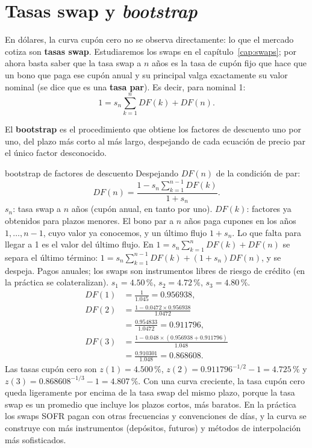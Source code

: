 \section{Tasas swap y \emph{bootstrap}}

En dólares, la curva cupón cero no se observa directamente: lo que el mercado cotiza son \textbf{tasas swap}. Estudiaremos los swaps en el capítulo~\ref{cap:swaps}; por ahora basta saber que la tasa swap a $n$ años es la tasa de cupón fijo que hace que un bono que paga ese cupón anual y su principal valga exactamente su valor nominal (se dice que es una \textbf{tasa par}). Es decir, para nominal 1:
\[ 1=s_n\sum_{k=1}^{n}DF(k)+DF(n). \]

\begin{definicion}
El \textbf{bootstrap} es el procedimiento que obtiene los factores de descuento uno por uno, del plazo más corto al más largo, despejando de cada ecuación de precio par el único factor desconocido.
\end{definicion}

\begin{ficha}{bootstrap de factores de descuento}
 Despejando $DF(n)$ de la condición de par:
\[ DF(n)=\frac{1-s_n\sum_{k=1}^{n-1}DF(k)}{1+s_n}. \]
 $s_n$: tasa swap a $n$ años (cupón anual, en tanto por uno). $DF(k)$: factores ya obtenidos para plazos menores.
 El bono par a $n$ años paga cupones en los años $1,\dots,n-1$, cuyo valor ya conocemos, y un último flujo $1+s_n$. Lo que falta para llegar a 1 es el valor del último flujo.
 En $1=s_n\sum_{k=1}^{n}DF(k)+DF(n)$ se separa el último término: $1=s_n\sum_{k=1}^{n-1}DF(k)+(1+s_n)DF(n)$, y se despeja.
 Pagos anuales; los swaps son instrumentos libres de riesgo de crédito (en la práctica se colateralizan).
 $s_1=4.50\,\%$, $s_2=4.72\,\%$, $s_3=4.80\,\%$.
\begin{align*}
DF(1)&=\frac{1}{1.045}=0.956938,\\
DF(2)&=\frac{1-0.0472\times0.956938}{1.0472}\\ &=\frac{0.954833}{1.0472}=0.911796,\\
DF(3)&=\frac{1-0.048\times(0.956938+0.911796)}{1.048}\\ &=\frac{0.910301}{1.048}=0.868608.
\end{align*}
Las tasas cupón cero son $z(1)=4.500\,\%$, $z(2)=0.911796^{-1/2}-1=4.725\,\%$ y $z(3)=0.868608^{-1/3}-1=4.807\,\%$.
 Con una curva creciente, la tasa cupón cero queda ligeramente por encima de la tasa swap del mismo plazo, porque la tasa swap es un promedio que incluye los plazos cortos, más baratos.
 En la práctica los swaps SOFR pagan con otras frecuencias y convenciones de días, y la curva se construye con más instrumentos (depósitos, futuros) y métodos de interpolación más sofisticados.
\end{ficha}

